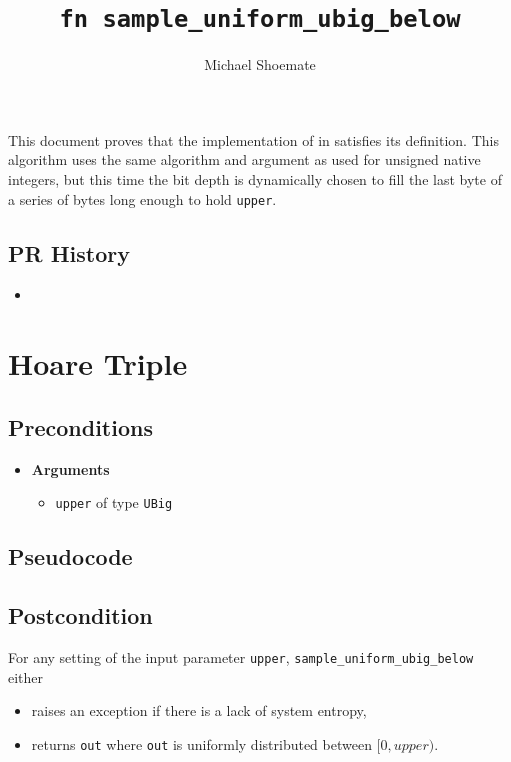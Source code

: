 \documentclass{article}
\title{\texttt{fn sample\_uniform\_ubig\_below}}
\author{Michael Shoemate}
\begin{document}
\maketitle

\contrib

This document proves that the implementation of  in  
satisfies its definition.
This algorithm uses the same algorithm and argument as used for unsigned native integers, 
but this time the bit depth is dynamically chosen to fill the last byte of a series of bytes long enough to hold \texttt{upper}.

\subsection*{PR History}
\begin{itemize}
    \item {}
\end{itemize}

\section{Hoare Triple}
\subsection*{Preconditions}
\begin{itemize}
    \item \textbf{Arguments}
    \begin{itemize}
        \item \texttt{upper} of type \texttt{UBig}
    \end{itemize}
\end{itemize}

\subsection*{Pseudocode}



\subsection*{Postcondition}
For any setting of the input parameter \texttt{upper},
\texttt{sample\_uniform\_ubig\_below} either
\begin{itemize}
    \item raises an exception if there is a lack of system entropy,
    \item returns \texttt{out} where \texttt{out} is uniformly distributed between $[0, upper)$.
\end{itemize}
\end{document}
